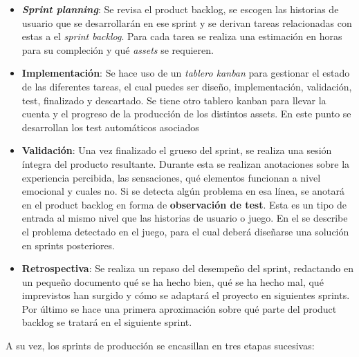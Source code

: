 \begin{itemize}
    \item \textbf{\textit{Sprint planning}}: Se revisa el product backlog, se escogen las historias de usuario que se desarrollarán en ese sprint y se derivan tareas relacionadas con estas a el \textit{sprint backlog}. Para cada tarea se realiza una estimación en horas para su compleción y qué \textit{assets} se requieren.
    \item \textbf{Implementación}: Se hace uso de un \textit{tablero kanban} para gestionar el estado de las diferentes tareas, el cual puedes ser diseño, implementación, validación, test, finalizado y descartado. Se tiene otro tablero kanban para llevar la cuenta y el progreso de la producción de los distintos assets. En este punto se desarrollan los test automáticos asociados 
    \item \textbf{Validación}: Una vez finalizado el grueso del sprint, se realiza una sesión íntegra del producto resultante. Durante esta se realizan anotaciones sobre la experiencia percibida, las sensaciones, qué elementos funcionan a nivel emocional y cuales no. Si se detecta algún problema en esa línea, se anotará en el product backlog en forma de \textbf{observación de test}. Esta es un tipo de entrada al mismo nivel que las historias de usuario o juego. En el se describe el problema detectado en el juego, para el cual deberá diseñarse una solución en sprints posteriores.
    \item \textbf{Retrospectiva}: Se realiza un repaso del desempeño del sprint, redactando en un pequeño documento qué se ha hecho bien, qué se ha hecho mal, qué imprevistos han surgido y cómo se adaptará el proyecto en siguientes sprints. Por último se hace una primera aproximación sobre qué parte del product backlog se tratará en el siguiente sprint.
\end{itemize}

A su vez, los sprints de producción se encasillan en tres etapas sucesivas:

